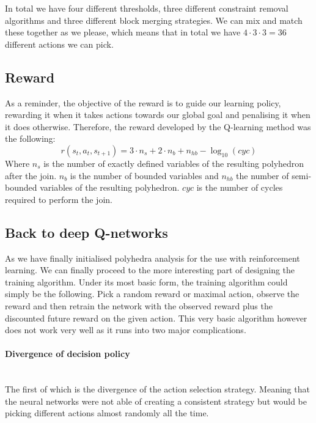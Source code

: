 In total we have four different thresholds, three different constraint removal algorithms and three different block merging strategies. We can mix and match these together as we please, which means that in total we have $4\cdot 3\cdot 3 =36$ different actions we can pick.

\subsection{Reward}
As a reminder, the objective of the reward is to guide our learning policy, rewarding it when it takes actions towards our global goal and penalising it when it does otherwise. Therefore, the reward developed by the Q-learning method was the following:
\begin{equation}
	r(s_t,a_t,s_{t+1}) = 3  \cdot n_s + 2 \cdot n_b + n_{hb} - \log_{10}(cyc)
\end{equation}
Where $n_s$ is the number of exactly defined variables of the resulting polyhedron after the join. $n_b$ is the number of bounded variables and $n_{hb}$ the number of semi-bounded variables of the resulting polyhedron. $cyc$ is the number of cycles required to perform the join.
\subsection{Back to deep Q-networks}
As we have finally initialised polyhedra analysis for the use with reinforcement learning. We can finally proceed to the more interesting part of designing the training algorithm. Under its most basic form, the training algorithm could simply be the following. Pick a random reward or maximal action, observe the reward and then retrain the network with the observed reward plus the discounted future reward on the given action. This very basic algorithm however does not work very well as it runs into two major complications.

\paragraph{Divergence of decision policy}\mbox{}\\
The first of which is the divergence of the action selection strategy. Meaning that the neural networks were not able of creating a consistent strategy but would be picking different actions almost randomly all the time.
